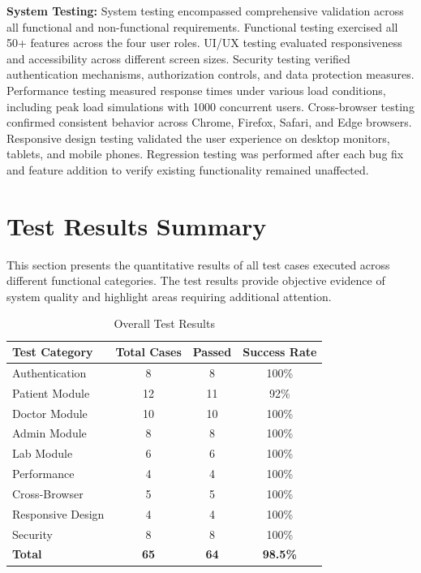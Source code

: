 \justifying
\noindent \textbf{System Testing:} System testing encompassed comprehensive validation across all functional and non-functional requirements. Functional testing exercised all 50+ features across the four user roles. UI/UX testing evaluated responsiveness and accessibility across different screen sizes. Security testing verified authentication mechanisms, authorization controls, and data protection measures. Performance testing measured response times under various load conditions, including peak load simulations with 1000 concurrent users. Cross-browser testing confirmed consistent behavior across Chrome, Firefox, Safari, and Edge browsers. Responsive design testing validated the user experience on desktop monitors, tablets, and mobile phones. Regression testing was performed after each bug fix and feature addition to verify existing functionality remained unaffected.

\section{Test Results Summary}

\justifying
\noindent This section presents the quantitative results of all test cases executed across different functional categories. The test results provide objective evidence of system quality and highlight areas requiring additional attention.

\begin{table}[H]
    \centering
    \small
    \begin{tabular}{|p{2.5cm}|c|c|c|}
        \hline
        \textbf{Test Category} & \textbf{Total Cases} & \textbf{Passed} & \textbf{Success Rate} \\
        \hline
        Authentication & 8 & 8 & 100\% \\
        \hline
        Patient Module & 12 & 11 & 92\% \\
        \hline
        Doctor Module & 10 & 10 & 100\% \\
        \hline
        Admin Module & 8 & 8 & 100\% \\
        \hline
        Lab Module & 6 & 6 & 100\% \\
        \hline
        Performance & 4 & 4 & 100\% \\
        \hline
        Cross-Browser & 5 & 5 & 100\% \\
        \hline
        Responsive Design & 4 & 4 & 100\% \\
        \hline
        Security & 8 & 8 & 100\% \\
        \hline
        \textbf{Total} & \textbf{65} & \textbf{64} & \textbf{98.5\%} \\
        \hline
    \end{tabular}
    \caption{Overall Test Results}
    \label{tab:test-summary}
\end{table}

